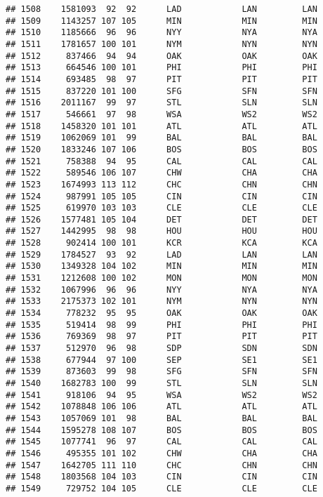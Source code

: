 \documentclass[]{article}
\begin{document}
\begin{verbatim}
## 1508    1581093  92  92      LAD            LAN         LAN
## 1509    1143257 107 105      MIN            MIN         MIN
## 1510    1185666  96  96      NYY            NYA         NYA
## 1511    1781657 100 101      NYM            NYN         NYN
## 1512     837466  94  94      OAK            OAK         OAK
## 1513     664546 100 101      PHI            PHI         PHI
## 1514     693485  98  97      PIT            PIT         PIT
## 1515     837220 101 100      SFG            SFN         SFN
## 1516    2011167  99  97      STL            SLN         SLN
## 1517     546661  97  98      WSA            WS2         WS2
## 1518    1458320 101 101      ATL            ATL         ATL
## 1519    1062069 101  99      BAL            BAL         BAL
## 1520    1833246 107 106      BOS            BOS         BOS
## 1521     758388  94  95      CAL            CAL         CAL
## 1522     589546 106 107      CHW            CHA         CHA
## 1523    1674993 113 112      CHC            CHN         CHN
## 1524     987991 105 105      CIN            CIN         CIN
## 1525     619970 103 103      CLE            CLE         CLE
## 1526    1577481 105 104      DET            DET         DET
## 1527    1442995  98  98      HOU            HOU         HOU
## 1528     902414 100 101      KCR            KCA         KCA
## 1529    1784527  93  92      LAD            LAN         LAN
## 1530    1349328 104 102      MIN            MIN         MIN
## 1531    1212608 100 102      MON            MON         MON
## 1532    1067996  96  96      NYY            NYA         NYA
## 1533    2175373 102 101      NYM            NYN         NYN
## 1534     778232  95  95      OAK            OAK         OAK
## 1535     519414  98  99      PHI            PHI         PHI
## 1536     769369  98  97      PIT            PIT         PIT
## 1537     512970  96  98      SDP            SDN         SDN
## 1538     677944  97 100      SEP            SE1         SE1
## 1539     873603  99  98      SFG            SFN         SFN
## 1540    1682783 100  99      STL            SLN         SLN
## 1541     918106  94  95      WSA            WS2         WS2
## 1542    1078848 106 106      ATL            ATL         ATL
## 1543    1057069 101  98      BAL            BAL         BAL
## 1544    1595278 108 107      BOS            BOS         BOS
## 1545    1077741  96  97      CAL            CAL         CAL
## 1546     495355 101 102      CHW            CHA         CHA
## 1547    1642705 111 110      CHC            CHN         CHN
## 1548    1803568 104 103      CIN            CIN         CIN
## 1549     729752 104 105      CLE            CLE         CLE

\end{verbatim}
\end{document}
